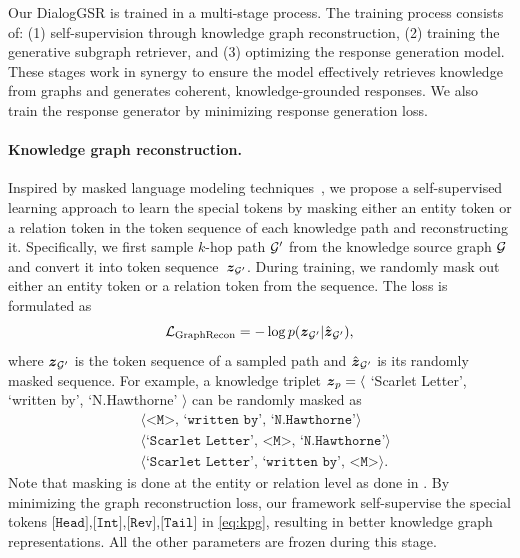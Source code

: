 \label{sec:3.5}


Our DialogGSR is trained in a multi-stage process.
The training process consists of: (1) self-supervision through knowledge graph reconstruction, (2) training the generative subgraph retriever, and (3) optimizing the response generation model. 
These stages work in synergy to ensure the model effectively retrieves knowledge from graphs and generates coherent, knowledge-grounded responses.
We also train the response generator by minimizing response generation loss.

\paragraph{Knowledge graph reconstruction.}
Inspired by masked language modeling techniques~\cite{roberts2019exploring,devlin2018bert}, we propose a self-supervised learning approach to learn the special tokens by masking either an entity token or a relation token in the token sequence of each knowledge path and reconstructing it.
Specifically, we first sample $k$-hop path $\mathcal{G}^\prime$ from the knowledge source graph $\mathcal{G}$ and convert it into token sequence~$\boldsymbol{z}_{\mathcal{G}^\prime}$.
During training, we randomly mask out either an entity token or a relation token from the sequence. 
The loss is formulated as
\begin{equation}
    \mathcal{L}_{\text{GraphRecon}} = -\log p(\boldsymbol{z}_{\mathcal{G}^\prime} | \hat{\boldsymbol{z}}_{\mathcal{G}^\prime}),
\end{equation}
where $\boldsymbol{z}_{\mathcal{G}^\prime}$ is the token sequence of a sampled path and $\hat{\boldsymbol{z}}_{\mathcal{G}^\prime}$ is its randomly masked sequence.
For example, a knowledge triplet $\boldsymbol{z}_p =\langle$ `Scarlet Letter', `written by', `N.Hawthorne' $\rangle$ can be randomly masked as 
\begin{equation*}
\begin{split}
&\langle \texttt{<M>, `written by', `N.Hawthorne'} \rangle \\
&\langle \texttt{`Scarlet Letter', <M>, `N.Hawthorne'} \rangle\\
&\langle \texttt{`Scarlet Letter', `written by', <M>} \rangle.
\end{split}
\end{equation*}
Note that masking is done at the entity or relation level as done in \citet{roberts2019exploring}. 
By minimizing the graph reconstruction loss, our framework self-supervise the special tokens $\texttt{[Head],[Int],[Rev],[Tail]}$ in \eqref{eq:kpg}, resulting in better knowledge graph representations.
All the other parameters are frozen during this stage.

